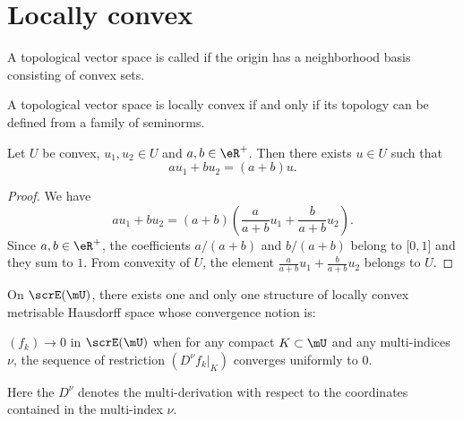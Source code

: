 \section{Locally convex}

\begin{definition}        \label{DEFooCGJBooSvDpyC}
	A topological vector space is called  if the origin has a neighborhood basis consisting of convex sets.
\end{definition}

\begin{proposition}
	A topological vector space is locally convex if and only if its topology can be defined from a family of seminorms.
\end{proposition}


\begin{lemma}   \label{LEMooAHUMooBwxzPj}
	Let \( U\) be convex, \( u_1, u_2\in U\) and \( a,b\in \eR^+\). Then there exists \( u\in U\) such that
	\begin{equation}
		au_1+bu_2=(a+b)u.
	\end{equation}
\end{lemma}

\begin{proof}
	We have
	\begin{equation}
		au_1+bu_2=(a+b)\left( \frac{ a }{ a+b }u_1+\frac{ b }{ a+b }u_2 \right).
	\end{equation}
	Since \( a,b\in \eR^+\), the coefficients \( a/(a+b)\) and \( b/(a+b)\) belong to \( \mathopen[ 0 , 1 \mathclose]\) and they sum to \( 1\). From convexity of \( U\), the element \( \frac{ a }{ a+b }u_1+\frac{ b }{ a+b }u_2\) belongs to \( U\).
\end{proof}

\begin{proposition}    \label{prop:topo_E}
	On $\scrE(\mU)$, there exists one and only one structure of locally convex metrisable Hausdorff space whose convergence notion is:

	$(f_k)\to 0$ in $\scrE(\mU)$ when for any compact $K\subset\mU$ and any multi-indices $\nu$, the sequence of restriction $(D^{\nu}f_k|_K)$ converges uniformly to $0$.

	Here the $D^{\nu}$ denotes the multi-derivation with respect to the coordinates contained in the multi-index $\nu$.
\end{proposition}

